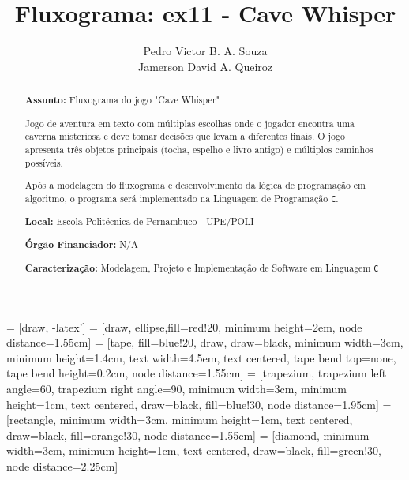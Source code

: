 \documentclass[a4paper,12pt]{article} %
\title{Fluxograma: ex11 - Cave Whisper}
\author{Pedro Victor B. A. Souza \\ Jamerson David A. Queiroz}
\begin{document}
\maketitle


 = [draw, -latex']
 = [draw, ellipse,fill=red!20, minimum height=2em, node distance=1.55cm]
 = [tape, fill=blue!20, draw, draw=black, minimum width=3cm, minimum height=1.4cm, text width=4.5em, text centered, tape bend top=none, tape bend height=0.2cm, node distance=1.55cm]
 = [trapezium, trapezium left angle=60, trapezium right angle=90, minimum width=3cm, minimum height=1cm, text centered, draw=black, fill=blue!30, node distance=1.95cm]
 = [rectangle, minimum width=3cm, minimum height=1cm, text centered, draw=black, fill=orange!30, node distance=1.55cm]
 = [diamond, minimum width=3cm, minimum height=1cm, text centered, draw=black, fill=green!30, node distance=2.25cm]


\begin{abstract}

\textbf{Assunto:} Fluxograma do jogo "Cave Whisper"

Jogo de aventura em texto com múltiplas escolhas onde o jogador encontra uma caverna misteriosa e deve tomar decisões que levam a diferentes finais. O jogo apresenta três objetos principais (tocha, espelho e livro antigo) e múltiplos caminhos possíveis.

Após a modelagem do fluxograma e desenvolvimento da lógica de programação em algoritmo, o programa será implementado na Linguagem de Programação \texttt{C}.

\textbf{Local:} Escola Politécnica de Pernambuco - UPE/POLI

\textbf{Órgão Financiador:} N/A

\textbf{Caracterização:} Modelagem, Projeto e Implementação de Software em Linguagem \texttt{C}

\end{abstract}

\end{document}
